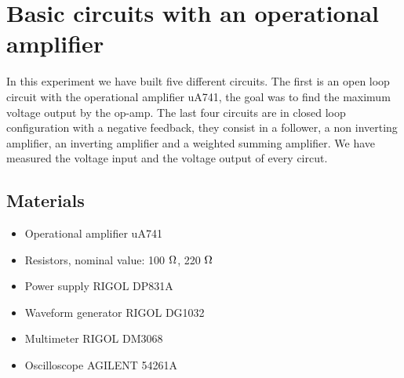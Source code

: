 \documentclass[oneside]{book}
\begin{document}

\tableofcontents
\chapter{Basic circuits with an operational amplifier}
In this experiment we have built five different circuits. The first is an open loop circuit with the operational amplifier uA741, the goal was to find the maximum voltage output by the op-amp. The last four circuits are in closed loop configuration with a negative feedback, they consist in a follower, a non inverting amplifier, an inverting amplifier and a weighted summing amplifier. We have measured the voltage input and the voltage output of every circut.
\section{Materials}
\begin{itemize}
\item Operational amplifier uA741
\item Resistors, nominal value: 100 $\ohm$, 220 $\ohm$
\item Power supply RIGOL DP831A
\item Waveform generator RIGOL DG1032
\item Multimeter RIGOL DM3068
\item Oscilloscope AGILENT 54261A
\end{itemize}
\end{document}
